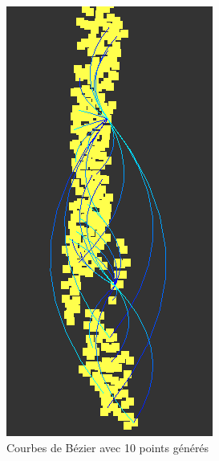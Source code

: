 \documentclass[12pt]{article}
\begin{document}
		\begin{figure}[!h]
		\begin{center}
		\includegraphics[scale=.60]{10_generated_points.png}
		\caption{Courbes de Bézier avec 10 points générés}
		\end{center}
		\end{figure}
		
\end{document}
